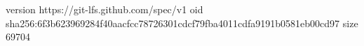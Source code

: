 version https://git-lfs.github.com/spec/v1
oid sha256:6f3b623969284f40aacfcc78726301cdcf79fba4011cdfa9191b0581eb00cd97
size 69704
